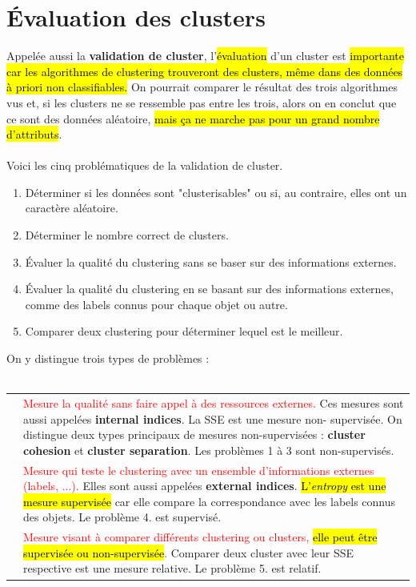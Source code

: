 \documentclass[letterpaper, 12pt]{article}
\newcommand{\alinea}{
\hspace*{0.5cm}}
\newcommand{\red}[1]{
	\textcolor{red}{#1}}
\newcommand{\myul}[1]{
		\underline{\smash{#1}}
	}
\begin{document}
	\section{\'Evaluation des clusters}
		\alinea Appelée aussi la \textbf{validation de cluster},
			l'\hl{évaluation}
			d'un cluster est \hl{importante car les algorithmes de clustering
			trouveront des clusters, même dans des données à priori non 
			classifiables.} On pourrait comparer le résultat des trois
			algorithmes vus et, si les clusters ne se ressemble pas 
			entre les trois, alors on en conclut que ce sont des données
			aléatoire, \hl{mais ça ne marche pas pour un grand nombre
			d'attributs}. \\
		~\\
		\alinea Voici les cinq problématiques de la validation de cluster.
		\begin{enumerate}
			\setlength{\itemsep}{0pt}
			\setlength{\parskip}{0pt}
			\setlength{\parsep}{0pt}
			\item Déterminer si les données sont "clusterisables" ou si, 
				au contraire, elles ont un caractère aléatoire.
			\item Déterminer le nombre correct de clusters.
			\item \'Evaluer la qualité du clustering sans se baser
				sur des informations externes.
			\item \'Evaluer la qualité du clustering en se basant
				sur des informations externes, comme des labels connus
				pour chaque objet ou autre.
			\item Comparer deux clustering pour déterminer lequel 
				est le meilleur.
		\end{enumerate}
		On y distingue trois types de problèmes : \\~\\
		\begin{tabular}{lp{14cm}}
			\myul{\textbf{\hl{Non-supervisé}}}	& 
				\red{Mesure la qualité sans faire appel à des
					 ressources externes.} Ces mesures sont aussi 
					 appelées \textbf{internal indices}.
					 La SSE est une mesure non-%
					 supervisée. On distingue deux types principaux
					 de mesures non-supervisées : \textbf{cluster cohesion}
					 et \textbf{cluster separation}. Les problèmes 
					 1 à 3 sont non-supervisés.\\
			\myul{\textbf{\hl{Supervisé}}}	&
				\red{Mesure qui teste le clustering avec un ensemble 
					 d'informations externes (labels, ...).} 
					 Elles sont aussi appelées \textbf{external indices}.
					\hl{ L'\textit{entropy} est une mesure supervisée} car
					 elle compare la correspondance avec les labels
					 connus des objets. Le problème 4. est supervisé.\\
			\myul{\textbf{\hl{Relatif}}} & 
				\red{Mesure visant à comparer différents clustering 
					 ou clusters, \hl{elle peut être 
					 supervisée ou non-supervisée}.} Comparer deux 
					 cluster avec leur SSE respective est une mesure
					 relative. Le problème 5. est relatif.
		\end{tabular}
\end{document}
